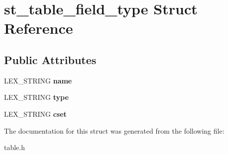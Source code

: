 \hypertarget{structst__table__field__type}{}\section{st\+\_\+table\+\_\+field\+\_\+type Struct Reference}
\label{structst__table__field__type}
\subsection*{Public Attributes}
\begin{DoxyCompactItemize}
\item 
\mbox{\label{structst__table__field__type_a3aa363a9aeeb7dc085734a1fdbe7f231}} 
L\+E\+X\+\_\+\+S\+T\+R\+I\+NG {\bfseries name}
\item 
\mbox{\label{structst__table__field__type_a78b3d80bd722c30dc72c2a2e2542109f}} 
L\+E\+X\+\_\+\+S\+T\+R\+I\+NG {\bfseries type}
\item 
\mbox{\label{structst__table__field__type_a1cc6e5e35a5c51959ef109969dfe830e}} 
L\+E\+X\+\_\+\+S\+T\+R\+I\+NG {\bfseries cset}
\end{DoxyCompactItemize}


The documentation for this struct was generated from the following file\+:\begin{DoxyCompactItemize}
\item 
table.\+h\end{DoxyCompactItemize}
